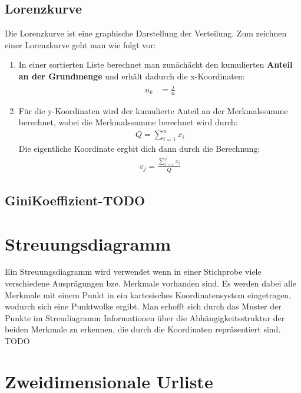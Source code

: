 \documentclass[a4paper,10pt]{scrartcl}
\begin{document}
\subsection{Lorenzkurve}
Die Lorenzkurve ist eine graphische Darstellung der Verteilung.
Zum zeichnen einer Lorenzkurve geht man wie folgt vor:
\begin{enumerate}
    \item In einer sortierten Liste berechnet man zunächächt den kumulierten \textbf{Anteil an der Grundmenge} und erhält dadurch die x-Koordinaten:
    \begin{align*}
    u_k&=\frac{j}{n}
    \end{align*}
    \item Für die y-Koordinaten wird der kumulierte Anteil an der Merkmalssumme berechnet, wobei die Merkmalssumme berechnet wird durch:
    \begin{align*}
    Q=\sum_{i=1}^n x_i
    \end{align*}
    Die eigentliche Koordinate ergbit dich dann durch die Berechnung:
    \begin{align*}
    v_j=\frac{\sum_{i=1}^j x_i}{Q}
    \end{align*}
\end{enumerate}

\subsection{GiniKoeffizient-TODO}
\section{Streuungsdiagramm}
Ein Streuungsdiagramm wird verwendet wenn in einer Stichprobe viele verschiedene Ausprägungen bze. Merkmale vorhanden sind. Es werden dabei alle Merkmale mit einem Punkt in ein kartesisches Koordinatensystem eingetragen, wodurch sich eine Punktwolke ergibt. Man erhofft sich durch das Muster der Punkte im Streudiagramm Informationen über die Abhängigkeitsstruktur der beiden Merkmale zu erkennen, die durch die Koordinaten repräsentiert sind.
TODO
\newpage
\section{Zweidimensionale Urliste}
\end{document}
